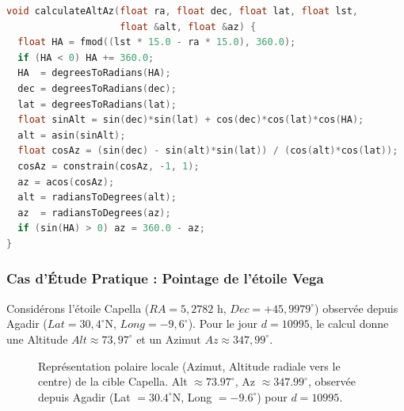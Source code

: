 \documentclass[12pt,a4paper]{report}
\begin{document}
\begin{enumerate}
\begin{lstlisting}[language=C++, caption={Fonctions \texttt{calculateGST}, \texttt{calculateLST} et \texttt{calculateAltAz}.}]
void calculateAltAz(float ra, float dec, float lat, float lst,
                    float &alt, float &az) {
  float HA = fmod((lst * 15.0 - ra * 15.0), 360.0);
  if (HA < 0) HA += 360.0;
  HA  = degreesToRadians(HA);
  dec = degreesToRadians(dec);
  lat = degreesToRadians(lat);
  float sinAlt = sin(dec)*sin(lat) + cos(dec)*cos(lat)*cos(HA);
  alt = asin(sinAlt);
  float cosAz = (sin(dec) - sin(alt)*sin(lat)) / (cos(alt)*cos(lat));
  cosAz = constrain(cosAz, -1, 1);
  az = acos(cosAz);
  alt = radiansToDegrees(alt);
  az  = radiansToDegrees(az);
  if (sin(HA) > 0) az = 360.0 - az;
}
\end{lstlisting}

\subsubsection{Cas d'Étude Pratique : Pointage de l'étoile Vega}
Considérons l'étoile Capella ($RA = 5{,}2782$ h, $Dec = +45{,}9979^\circ$) 
observée depuis Agadir ($Lat = 30{,}4^\circ$N, $Long = -9{,}6^\circ$). 
Pour le jour $d = 10995$, le calcul donne une 
Altitude $Alt \approx 73{,}97^\circ$ et un Azimut $Az \approx 347{,}99^\circ$.
\begin{figure}[H]
    \centering
    \caption{Représentation polaire locale (Azimut, Altitude radiale vers le 
    centre) de la cible Capella. Alt $\approx 73.97^\circ$, 
    Az $\approx 347.99^\circ$, observée depuis Agadir 
    (Lat $= 30.4^\circ$N, Long $= -9.6^\circ$) pour $d = 10995$.}
\end{figure}


\end{enumerate}
\end{document}
